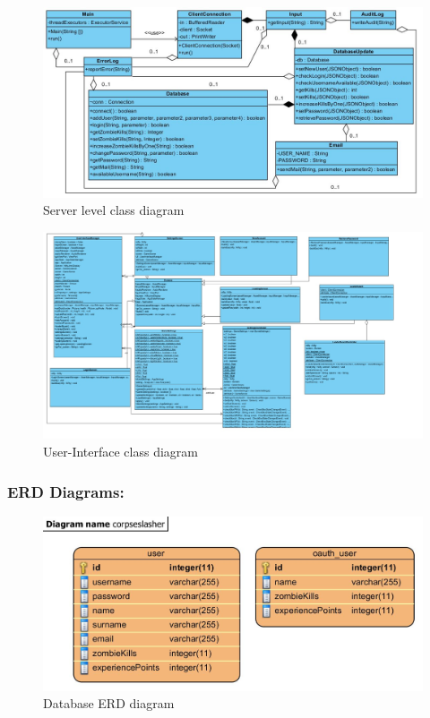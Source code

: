 \documentclass[letterpaper]{article}
\begin{document}
					\begin{figure}[H]
					\centering
					\includegraphics[width=180mm]{UML_Diagram/Class/Server_Classes.jpg}
					\caption{Server level class diagram}
					\label{overflow}
					\end{figure}
					
					\begin{figure}[H]
					\centering
					\includegraphics[width=180mm]{UML_Diagram/Class/GUI_Classes.jpg}
					\caption{User-Interface class diagram}
					\label{overflow}
					\end{figure}
					
				\vspace{0.2in}	
				\subsubsection*{ERD Diagrams:}
				\vspace{0.1in}
				
					\begin{figure}[H]
					\centering
					\includegraphics[width=180mm]{UML_Diagram/ERD/Database.jpg}
					\caption{Database ERD diagram}
					\label{overflow}
					\end{figure}
					
\end{document}
